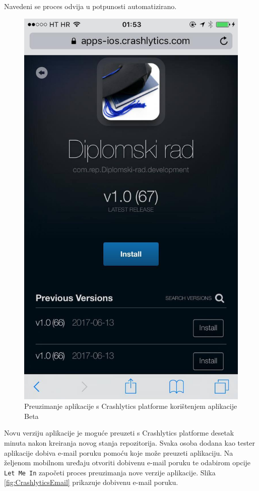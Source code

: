 \documentclass[times, utf8, diplomski, numeric]{fer}
\begin{document}
Navedeni se proces odvija u potpunosti automatizirano.

\begin{figure}[b!]
\centering
\includegraphics[scale=0.3]{Beta}
\caption{Preuzimanje aplikacije s Crashlytics platforme korištenjem aplikacije Beta}
\label{fig:Beta}
\end{figure}

Novu verziju aplikacije je moguće preuzeti s Crashlytics platforme desetak minuta nakon kreiranja novog stanja repozitorija. Svaka osoba dodana kao tester aplikacije dobiva e-mail poruku pomoću koje može preuzeti aplikaciju. Na željenom mobilnom uređaju otvoriti dobivenu e-mail poruku te odabirom opcije \verb|Let Me In| započeti proces preuzimanja nove verzije aplikacije. Slika \ref{fig:CrashlyticsEmail} prikazuje dobivenu e-mail poruku.
\end{document}
